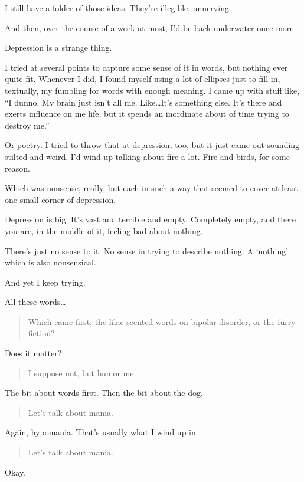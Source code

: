 I still have a folder of those ideas. They're illegible, unnerving.

And then, over the course of a week at most, I'd be back underwater once more.

Depression is a strange thing.

I tried at several points to capture some sense of it in words, but nothing ever quite fit. Whenever I did, I found myself using a lot of ellipses just to fill in, textually, my fumbling for words with enough meaning. I came up with stuff like, ``I dunno. My brain just isn't all me. Like\ldots{}It's something else. It's there and exerts influence on me life, but it spends an inordinate about of time trying to destroy me.''

Or poetry. I tried to throw that at depression, too, but it just came out sounding stilted and weird. I'd wind up talking about fire a lot. Fire and birds, for some reason.

Which was nonsense, really, but each in such a way that seemed to cover at least one small corner of depression.

Depression is big. It's vast and terrible and empty. Completely empty, and there you are, in the middle of it, feeling bad about nothing.

There's just no sense to it. No sense in trying to describe nothing. A `nothing' which is also nonsensical.

And yet I keep trying.

All these words\ldots{}

\begin{quote}
Which came first, the lilac-scented words on bipolar disorder, or the furry fiction?
\end{quote}

Does it matter?

\begin{quote}
I suppose not, but humor me.
\end{quote}

The bit about words first. Then the bit about the dog.

\begin{quote}
Let's talk about mania.
\end{quote}

Again, hypomania. That's usually what I wind up in.

\begin{quote}
Let's talk about mania.
\end{quote}

Okay.
